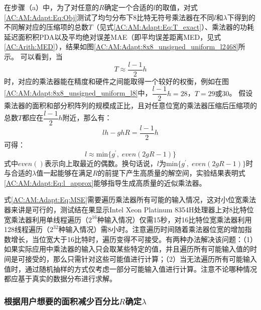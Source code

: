 在步骤（a）中，为了对任意的$R$确定一个合适的$l$的取值，对式\eqref{AC:AM:Adapt:Eq:Obj}测试了均匀分布下8比特无符号乘法器在不同$l$和$\lambda$下得到的不同解对应的压缩项的总数$T$（见式\eqref{AC:AM:Adapt:Eq:T_exact}）、乘法器的功耗延迟面积积PDA以及平均绝对误差MAE（即平均误差距离MED，见式\ref{AC:Arith:MED}），结果如图\ref{AC:AM:Adapt:8x8_unsigned_uniform_l2468}所示。
可以看到，当
\begin{equation}
    T \approx \frac{l-1}{2} h
\label{AC:AM:Adapt:Eq:T_approx}
\end{equation}
时，对应的乘法器能在精度和硬件之间能取得一个较好的权衡，例如在图\ref{AC:AM:Adapt:8x8_unsigned_uniform_l8}中，$\dfrac{l-1}{2} h=28$，$T=29\text{或}30$。
假设乘法器的面积和部分积阵列的规模成正比，且对任意位宽的乘法器压缩后压缩项的总数$T$都应在$\dfrac{l-1}{2} h$附近，那么有：
\begin{equation}
    lh - ghR = \frac{l-1}{2} h
\end{equation}
可得：
\begin{equation}
    l \approx \text{min} \{g^{\prime}, \; even ( 2gR-1 ) \}
\label{AC:AM:Adapt:Eq:l_approx}
\end{equation}
式中$even()$表示向上取最近的偶数。换句话说，$l$为$\text{min} \{g^{\prime}, \; even ( 2gR-1 ) \}$时与合适的$\lambda$值一起能够在满足$R$的前提下产生高质量的解空间，实验结果表明式\eqref{AC:AM:Adapt:Eq:l_approx}能够指导生成高质量的近似乘法器。

式\eqref{AC:AM:Adapt:Eq:MSE}需要遍历乘法器所有可能的输入情况，这对小位宽乘法器来讲是可行的，测试结在果显示Intel Xeon Platinum 8354H处理器上对8比特位宽乘法器利用单线程遍历（$2^{16}$种输入情况）仅需15秒，对16比特位宽乘法器利用128线程遍历（$2^{32}$种输入情况）需8小时。注意遍历时间随着乘法器位宽的增加指数增长，当位宽大于16比特时，遍历变得不可接受。有两种办法解决该问题：（1）如果实际应用中乘法器的输入只会取某些特定的值，并且遍历所有可能输入值的时间是可接受的，那么只需针对这些可能值进行计算；（2）当无法遍历所有可能输入值时，通过随机抽样的方式仅考虑一部分可能输入值进行计算。注意不论哪种情况都应基于真实的数据分布进行求解。

\subsubsection{根据用户想要的面积减少百分比$R$确定$\lambda$}

